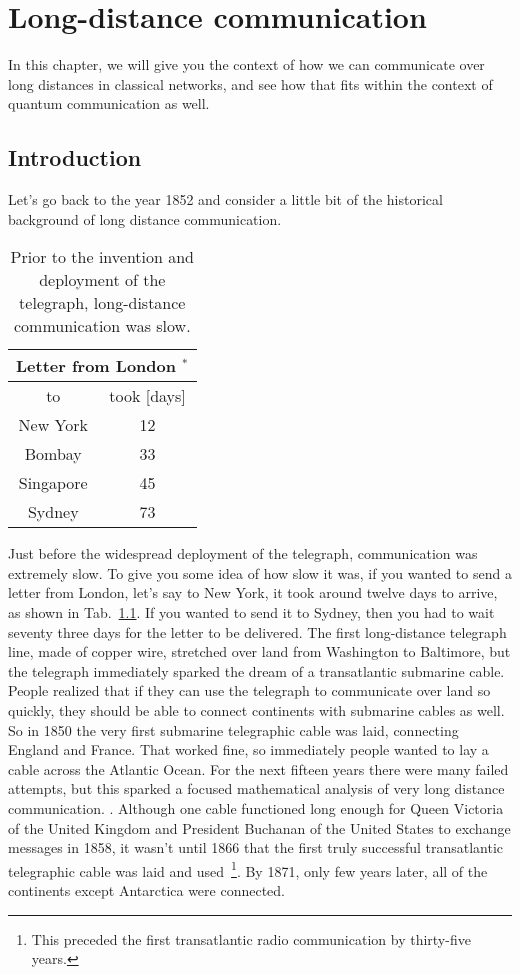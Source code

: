 \chapter{Long-distance communication}
\label{sec:11_long-distance}

In this chapter, we will give you the context of how we can communicate over long distances in classical networks, and see how that fits within the context of quantum communication as well.

\section{Introduction}
\label{sec:ld-intro}


Let's go back to the year 1852 and consider a little bit of the historical background of long distance communication.

\begin{table}
\centering
\begin{tabular}{|c|c|}
\hline \multicolumn{2}{|c|}{ Letter from London ${ }^*$} \\
\hline to & took [days] \\
\hline New York & 12 \\
Bombay & 33 \\
Singapore & 45 \\
Sydney & 73 \\
\hline
\end{tabular}
\caption{Prior to the invention and deployment of the telegraph, long-distance communication was slow.}
\label{tab:london-letter}
\end{table}

Just before the widespread deployment of the telegraph, communication was extremely slow. To give you some idea of how slow it was, if you wanted to send a letter from London, let's say to New York, it took around twelve days to arrive, as shown in Tab.~\ref{tab:london-letter}. If you wanted to send it to Sydney, then you had to wait seventy three days for the letter to be delivered. The first long-distance telegraph line, made of copper wire, stretched over land from Washington to Baltimore, but the telegraph immediately sparked the dream of a transatlantic submarine cable. People realized that if they can use the telegraph to communicate over land so quickly, they should be able to connect continents with submarine cables as well. So in 1850 the very first submarine telegraphic cable was laid, connecting England and France. That worked fine, so immediately people wanted to lay a cable across the Atlantic Ocean. For the next fifteen years there were many failed attempts, but this sparked a focused mathematical analysis of very long distance communication. . Although one cable functioned long enough for Queen Victoria of the United Kingdom and President Buchanan of the United States to exchange messages in 1858, it wasn't until 1866 that the first truly successful transatlantic telegraphic cable was laid and used~\footnote{This preceded the first transatlantic radio communication by thirty-five years.}. By 1871, only few years later, all of the continents except Antarctica were connected.


